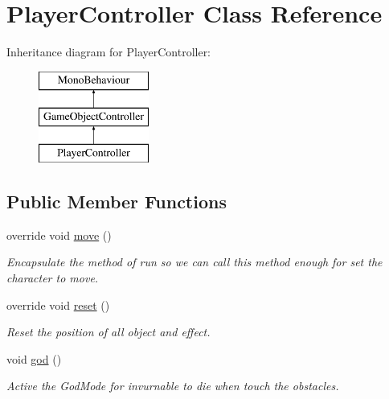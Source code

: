 \hypertarget{class_player_controller}{}\section{Player\+Controller Class Reference}
\label{class_player_controller}
Inheritance diagram for Player\+Controller\+:\begin{figure}[H]
\begin{center}
\leavevmode
\includegraphics[height=3.000000cm]{class_player_controller}
\end{center}
\end{figure}
\subsection*{Public Member Functions}
\begin{DoxyCompactItemize}
\item 
override void \hyperlink{class_player_controller_ad29e0ec800244a64e7f2362196cdbf6c}{move} ()
\begin{DoxyCompactList}\small\item\em Encapsulate the method of run so we can call this method enough for set the character to move. \end{DoxyCompactList}\item 
override void \hyperlink{class_player_controller_a8fd9b4a9dc641b4b4c9ca0949f083b41}{reset} ()
\begin{DoxyCompactList}\small\item\em Reset the position of all object and effect. \end{DoxyCompactList}\item 
void \hyperlink{class_player_controller_a45688721d2847fdfcfeeda34b6911b6c}{god} ()
\begin{DoxyCompactList}\small\item\em Active the God\+Mode for invurnable to die when touch the obstacles. \end{DoxyCompactList}\end{DoxyCompactItemize}
